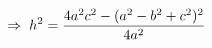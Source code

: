 \documentclass[preview]{standalone}
\begin{document}
\begin{align*}
\special{dvisvgm:raw <g id='unique000'>}\Rightarrow\; h^2 = \frac{4a^2c^2 - (a^2-b^2+c^2)^2}{4a^2}\special{dvisvgm:raw </g>}
\end{align*}
\end{document}

